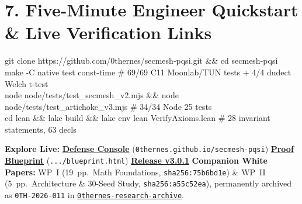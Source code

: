 \documentclass[10pt,letterpaper]{article}
\begin{document}
\section{7. Five-Minute Engineer Quickstart \& Live Verification Links}
\begin{tcolorbox}[colback=softbg, colframe=rulecol, boxrule=0.5pt, arc=2pt, left=5.5pt, right=5.5pt, top=2.4pt, bottom=2.4pt]
\fontsize{7.0pt}{8.4pt}\selectfont\ttfamily
git clone https://github.com/0thernes/secmesh-pqsi.git \&\& cd secmesh-pqsi\\
make -C native test const-time \hspace{2.3em}\# 69/69 C11 Moonlab/TUN tests + 4/4 dudect Welch t-test\\
node node/tests/test\_secmesh\_v2.mjs \&\& node node/tests/test\_artichoke\_v3.mjs \hspace{0.5em}\# 34/34 Node 25 tests\\
cd lean \&\& lake build \&\& lake env lean VerifyAxioms.lean \hspace{0.6em}\# 28 invariant statements, 63 decls
\end{tcolorbox}
\vspace{-2pt}
{\fontsize{7.15pt}{8.6pt}\selectfont\RaggedRight
\textbf{Explore Live:} \href{https://0thernes.github.io/secmesh-pqsi/}{\textbf{Defense Console}} (\texttt{0thernes.github.io/secmesh-pqsi}) \;\textbullet\; \href{https://0thernes.github.io/secmesh-pqsi/blueprint.html}{\textbf{Proof Blueprint}} (\texttt{.../blueprint.html}) \;\textbullet\; \href{https://github.com/0thernes/secmesh-pqsi/releases/tag/v3.0.1}{\textbf{Release v3.0.1}} \;\textbullet\; \textbf{Companion White Papers:} WP~I (19~pp.\ Math Foundations, \texttt{sha256:75b6bd1e}) \& WP~II (5~pp.\ Architecture \& 30-Seed Study, \texttt{sha256:a55c52ea}), permanently archived as \texttt{0TH-2026-011} in \href{https://github.com/0thernes/0thernes-research-archive}{\texttt{0thernes-research-archive}}.\par}
\end{document}
